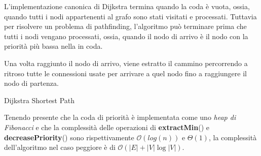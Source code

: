 \documentclass[11pt]{article}
\begin{document}
\par{
L'implementazione canonica di Dijkstra termina quando la coda \`e vuota, ossia, quando tutti i nodi appartenenti al grafo sono stati visitati e processati. Tuttavia per risolvere un problema di pathfinding, l'algoritmo pu\`o terminare prima che tutti i nodi vengano processati, ossia, quando il nodo di arrivo \`e il nodo con la priorit\`a pi\`u bassa nella in coda.
}
\par{
Una volta raggiunto il nodo di arrivo, viene estratto il cammino percorrendo a ritroso tutte le connessioni usate per arrivare a quel nodo fino a raggiungere il nodo di partenza.
}

\begin{algorithm}
\PrintSemicolon
\caption{Dijkstra Shortest Path}
  \LinesNumbered
\end{algorithm}


\par{
Tenendo presente che la coda di priorit\`a \`e implementata come uno \emph{heap di Fibonacci} e che la complessit\`a delle operazioni di \textbf{extractMin}() e \textbf{decreasePriority}() sono rispettivamente $\mathcal{O}(log(n))$ e $\Theta(1)$, la complessit\`a dell'algoritmo nel caso peggiore \`e di $\mathcal{O}(|E| + |V| \log|V|)$.
}
\end{document}
